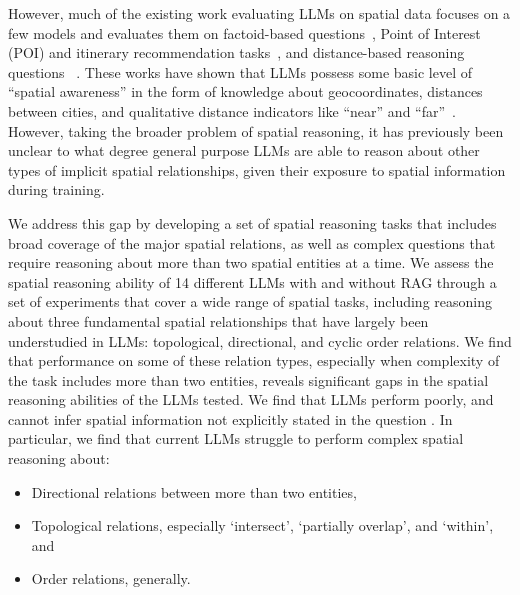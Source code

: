 However, much of the existing work evaluating LLMs on spatial data focuses on a few models and evaluates them on factoid-based questions~\cite{Qi2023,Roberts2023,Gupta2024,Yan2024}, Point of Interest (POI) and itinerary recommendation tasks~\cite{Schneider2025,Yu2025,Roberts2023,Xie2024,Gundawar2024,De2024}, and distance-based reasoning questions~\cite{Bhandari2023,Osullivan2024,Schneider2025b} .
These works have shown that LLMs possess some basic level of ``spatial awareness'' in the form of knowledge about geocoordinates, distances between cities, and qualitative distance indicators like ``near'' and ``far''~\cite{Bhandari2023,Qi2023,Osullivan2024}.
However, taking the broader problem of spatial reasoning, it has previously been unclear to what degree general purpose LLMs are able to reason about other types of implicit spatial relationships, given their exposure to spatial information during training.

We address this gap by developing a set of spatial reasoning tasks that includes broad coverage of the major spatial relations, as well as complex questions that require reasoning about more than two spatial entities at a time.
We assess the spatial reasoning ability of 14 different LLMs with and without RAG through a set of experiments that cover a wide range of spatial tasks, including reasoning about three fundamental spatial relationships that have largely been understudied in LLMs: topological, directional, and cyclic order relations.
We find that performance on some of these relation types, especially when complexity of the task includes more than two entities, reveals significant gaps in the spatial reasoning abilities of the LLMs tested. 
We find that LLMs perform poorly, and cannot infer spatial information not explicitly stated in the question .
In particular, we find that current LLMs struggle to perform complex spatial reasoning about:

\begin{itemize}
    \item Directional relations between more than two entities, 
    \item Topological relations, especially `intersect', `partially overlap', and `within', and
    \item Order relations, generally.
\end{itemize}

